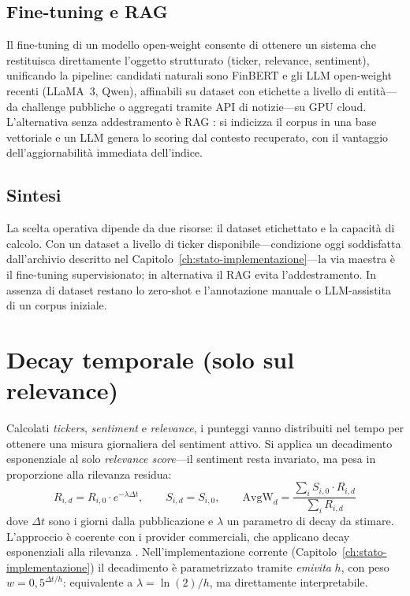 \subsection{Fine-tuning e RAG}

Il fine-tuning di un modello open-weight consente di ottenere un sistema che restituisca direttamente l'oggetto strutturato (ticker, relevance, sentiment), unificando la pipeline: candidati naturali sono FinBERT \parencite{araci2019finbert} e gli LLM open-weight recenti (LLaMA~3, Qwen), affinabili su dataset con etichette a livello di entità---da challenge pubbliche \parencite{maia201818} o aggregati tramite API di notizie---su GPU cloud.
L'alternativa senza addestramento è RAG \parencite{lewis2020retrieval}: si indicizza il corpus in una base vettoriale e un LLM genera lo scoring dal contesto recuperato, con il vantaggio dell'aggiornabilità immediata dell'indice.

\subsection{Sintesi}

La scelta operativa dipende da due risorse: il dataset etichettato e la capacità di calcolo.
Con un dataset a livello di ticker disponibile---condizione oggi soddisfatta dall'archivio descritto nel Capitolo~\ref{ch:stato-implementazione}---la via maestra è il fine-tuning supervisionato; in alternativa il RAG evita l'addestramento.
In assenza di dataset restano lo zero-shot e l'annotazione manuale o LLM-assistita di un corpus iniziale.

\section{Decay temporale (solo sul relevance)}

Calcolati \textit{tickers}, \textit{sentiment} e \textit{relevance}, i punteggi vanno distribuiti nel tempo per ottenere una misura giornaliera del sentiment attivo.
Si applica un decadimento esponenziale al solo \textit{relevance score}---il sentiment resta invariato, ma pesa in proporzione alla rilevanza residua:
\[
R_{i,d} = R_{i,0} \cdot e^{-\lambda \Delta t}, \qquad S_{i,d} = S_{i,0},
\qquad
\text{AvgW}_d = \frac{\sum_i S_{i,0} \cdot R_{i,d}}{\sum_i R_{i,d}}
\]
dove $\Delta t$ sono i giorni dalla pubblicazione e $\lambda$ un parametro di decay da stimare.
L'approccio è coerente con i provider commerciali, che applicano decay esponenziali alla rilevanza \parencite{ravenpack_relevance, ravenpack_forex, ravenpack_credit}.
Nell'implementazione corrente (Capitolo~\ref{ch:stato-implementazione}) il decadimento è parametrizzato tramite \emph{emivita} $h$, con peso $w = 0{,}5^{\Delta t / h}$: equivalente a $\lambda = \ln(2)/h$, ma direttamente interpretabile.

